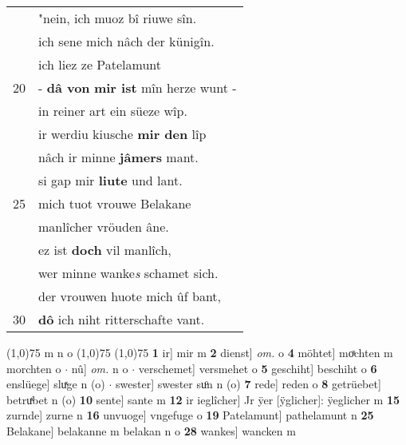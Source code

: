 \documentclass[8pt,a4paper,notitlepage]{article}
\begin{document}
\begin{table}[ht]
\begin{minipage}[t]{0.5\linewidth}
\begin{tabular}{rl}
 & "nein, ich muoz bî riuwe sîn.\\ 
 & ich sene mich nâch der künigîn.\\ 
 & ich liez ze Patelamunt\\ 
20 & - \textbf{dâ von} \textbf{mir ist} mîn herze wunt -\\ 
 & in reiner art ein süeze wîp.\\ 
 & ir werdiu kiusche \textbf{mir den} lîp\\ 
 & nâch ir minne \textbf{jâmers} mant.\\ 
 & si gap mir \textbf{liute} und lant.\\ 
25 & mich tuot vrouwe Belakane\\ 
 & manlîcher vröuden âne.\\ 
 & ez ist \textbf{doch} vil manlîch,\\ 
 & wer minne wanke\textit{s} schamet sich.\\ 
 & der vrouwen huote mich ûf bant,\\ 
30 & \textbf{dô} ich niht ritterschafte vant.\\ 
\end{tabular}
\scriptsize
\line(1,0){75} \newline
m n o \newline
\line(1,0){75} \newline
\newline
\line(1,0){75} \newline
\textbf{1} ir] mir m \textbf{2} dienst] \textit{om.} o \textbf{4} möhtet] moͯchten m morchten o  $\cdot$ nû] \textit{om.} n o  $\cdot$ verschemet] versmehet o \textbf{5} geschiht] beschiht o \textbf{6} enslüege] sluͯge n (o)  $\cdot$ swester] swester suͦn n (o) \textbf{7} rede] reden o \textbf{8} getrüebet] betruͯbet n (o) \textbf{10} sente] sante m \textbf{12} ir ieglîcher] Jr ÿer [ÿglicher]: ÿeglicher m \textbf{15} zurnde] zurne n \textbf{16} unvuoge] vngefuge o \textbf{19} Patelamunt] pathelamunt n \textbf{25} Belakane] belakanne m belakan n o \textbf{28} wankes] wancken m \newline
\end{minipage}
\end{table}
\newpage
\end{document}
